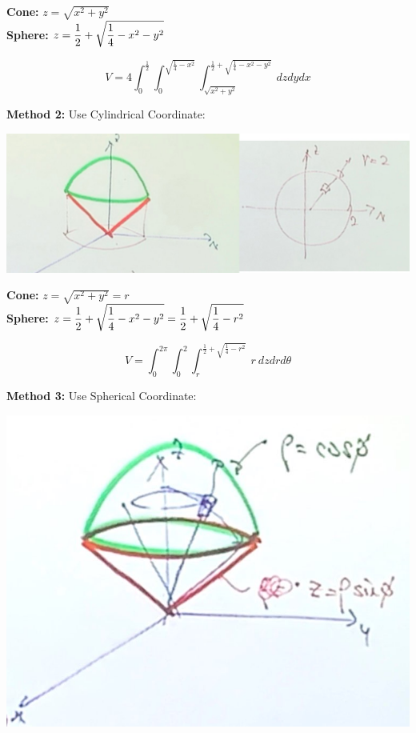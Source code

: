 \begin{spacing}{1.3}
    {\bf Cone:} $z=\sqrt{x^2+y^2}$\\
    {\bf Sphere:} $\displaystyle z=\frac{1}{2}+\sqrt{\frac{1}{4}-x^2-y^2}$

    $$V=4\int_0^{\frac{1}{2}}\int_0^{\sqrt{\frac{1}{4}-x^2}} \int_{\sqrt{x^2+y^2}}^{\frac{1}{2}+\sqrt{\frac{1}{4}-x^2-y^2}}
    \ dzdydx$$

    {\bf Method 2:} Use Cylindrical Coordinate: 
    \begin{center}
        \includegraphics[scale=0.3]{images/Ch14-ex6.10-cylind.jpg}
    \end{center}
    
    {\bf Cone:} $z=\sqrt{x^2+y^2}=r$\\
    {\bf Sphere:} $\displaystyle z=\frac{1}{2}+\sqrt{\frac{1}{4}-x^2-y^2}=\frac{1}{2}+\sqrt{\frac{1}{4}-r^2}$

    $$V=\int_0^{2\pi} \int_0^2 \int_r^{\frac{1}{2}+\sqrt{\frac{1}{4}-r^2}}\ r\ dzdrd\theta$$

    {\bf Method 3:} Use Spherical Coordinate: 
    \begin{center}
        \includegraphics[scale=0.28]{images/Ch14-ex6.10-sphere.JPG}
    \end{center}
    

\end{spacing}
